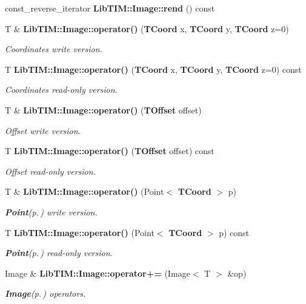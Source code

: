 \begin{CompactItemize}
\item 
const\_\-reverse\_\-iterator {\bf Lib\-TIM::Image::rend} () const 
\item 
T \& {\bf Lib\-TIM::Image::operator()} ({\bf TCoord} x, {\bf TCoord} y, {\bf TCoord} z=0)
\begin{CompactList}\small\item\em Coordinates write version. \item\end{CompactList}\item 
T {\bf Lib\-TIM::Image::operator()} ({\bf TCoord} x, {\bf TCoord} y, {\bf TCoord} z=0) const 
\begin{CompactList}\small\item\em Coordinates read-only version. \item\end{CompactList}\item 
T \& {\bf Lib\-TIM::Image::operator()} ({\bf TOffset} offset)
\begin{CompactList}\small\item\em Offset write version. \item\end{CompactList}\item 
T {\bf Lib\-TIM::Image::operator()} ({\bf TOffset} offset) const 
\begin{CompactList}\small\item\em Offset read-only version. \item\end{CompactList}\item 
T \& {\bf Lib\-TIM::Image::operator()} (Point$<$ {\bf TCoord} $>$ p)
\begin{CompactList}\small\item\em {\bf Point}{\rm (p.\,\pageref{classLibTIM_1_1Point})} write version. \item\end{CompactList}\item 
T {\bf Lib\-TIM::Image::operator()} (Point$<$ {\bf TCoord} $>$ p) const 
\begin{CompactList}\small\item\em {\bf Point}{\rm (p.\,\pageref{classLibTIM_1_1Point})} read-only version. \item\end{CompactList}\item 
Image \& {\bf Lib\-TIM::Image::operator+=} (Image$<$ T $>$ \&op)
\begin{CompactList}\small\item\em {\bf Image}{\rm (p.\,\pageref{classLibTIM_1_1Image})} operators. \item\end{CompactList}\item 

\end{CompactItemize}
